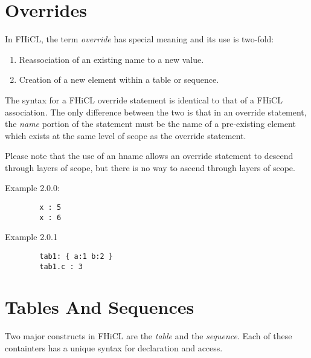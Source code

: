 \documentclass{article}
\begin{document}
\section{Overrides}
	In FHiCL, the term \emph{override} has special meaning and its use is two-fold:
	\begin{enumerate}
		\item Reassociation of an existing name to a new value.
		\item Creation of a new element within a table or sequence.
	\end{enumerate}
	\par
	The syntax for a FHiCL override statement is identical to that of a FHiCL association.
	The only difference between the two is that in an override statement,
	the \emph{name} portion of the statement must be the name of a pre-existing element
	which exists at the same level of scope as the override statement.
	\par
	Please note that the use of an hname allows an override statement to descend through layers of scope,
	but there is no way to ascend through layers of scope.
	\par
	Example 2.0.0:
	\begin{verbatim}
		x : 5
		x : 6
	\end{verbatim}
	\par
	Example 2.0.1
	\begin{verbatim}
		tab1: { a:1 b:2 }
		tab1.c : 3
	\end{verbatim}
\section{Tables And Sequences}
	Two major constructs in FHiCL are the \emph{table} and the \emph{sequence}.
	Each of these containters has a unique syntax for declaration and access.
\end{document}
